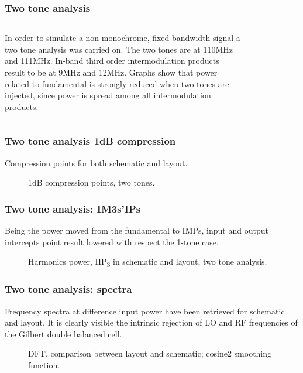 \begin{frame}
\frametitle{Two tone analysis}
\begin{columns}
	In order to simulate a non monochrome, fixed bandwidth signal a two tone analysis was carried on. The two tones are at 110MHz and 111MHz. In-band third order intermodulation products result to be at 9MHz and 12MHz. Graphs show that power related to fundamental is strongly reduced when two tones are injected, since power is spread among all intermodulation products.
	\begin{figure}[H] 
		\centering
		\\
		\label{fig:1dB_2tones}
	\end{figure}
\end{columns}
\end{frame}


\begin{frame}
\frametitle{Two tone analysis 1dB compression}
	Compression points for both schematic and layout.
	\begin{figure}[H] 
		\centering
		\caption{1dB compression points, two tones.}
		\label{fig:1dB_2tones}
	\end{figure}
\end{frame}


\begin{frame}
\frametitle{Two tone analysis: IM3s'IPs}
Being the power moved from the fundamental to IMPs, input and output intercepts point result lowered with respect the 1-tone case.
\begin{figure}[H] 
	\centering
	\caption{Harmonics power, IIP\textsubscript{3} in schematic and layout, two tone analysis.}
	\label{fig:IIP3_2t_schem}
\end{figure}
\end{frame}

\begin{frame}
\frametitle{Two tone analysis: spectra}
Frequency spectra at difference input power have been retrieved for schematic and layout. It is clearly visible the intrinsic rejection of LO and RF frequencies of the Gilbert double balanced cell.
\begin{figure}[H] 
	\centering
	\caption{DFT, comparison between layout and schematic; cosine2 smoothing function.}
	\label{fig:DFT_2ton}
\end{figure}
\end{frame}


